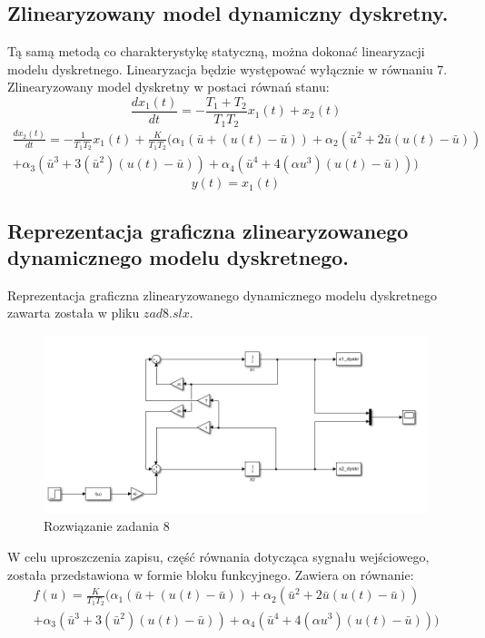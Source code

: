 \subsection{Zlinearyzowany model dynamiczny dyskretny.}
Tą samą metodą co charakterystykę statyczną, można dokonać linearyzacji modelu dyskretnego. Linearyzacja będzie występować wyłącznie w równaniu 7. \\
Zlinearyzowany model dyskretny w postaci równań stanu:
\begin{equation}
\frac{dx_{1}(t)}{dt} = -\frac{T_{1}+T_{2}}{T_{1}T_{2}}x_{1}(t) + x_{2}(t)
\end{equation}
\begin{multline}
\frac{dx_{2}(t)}{dt} = -\frac{1}{T_{1}T_{2}}x_{1}(t) + \frac{K}{T_{1}T_{2}}(\alpha_{1}(\bar{u}+(u(t)-\bar{u})) + \alpha_{2}(\bar{u}^2 + 2\bar{u}(u(t)-\bar{u})) \\
+\alpha_{3}(\bar{u}^3 + 3(\bar{u}^2)(u(t)-\bar{u}))+\alpha_{4}  (\bar{u}^4 + 4(\alpha{u}^3)(u(t)-\bar{u})))
\end{multline}
\begin{equation}
y(t)=x_{1}(t)
\end{equation}
\subsection{Reprezentacja graficzna zlinearyzowanego dynamicznego modelu dyskretnego.}
Reprezentacja graficzna zlinearyzowanego dynamicznego modelu dyskretnego zawarta została w pliku $zad8.slx$.
\begin{figure}[H]
\centering
\includegraphics[width=15cm]{images/zad8.png}
\caption{Rozwiązanie zadania 8}
\label{fig:zad8}
\end{figure}
W celu uproszczenia zapisu, część równania dotycząca sygnału wejściowego, została przedstawiona w formie bloku funkcyjnego. Zawiera on równanie:
\begin{multline}
f(u) = \frac{K}{T_{1}T_{2}}(\alpha_{1}(\bar{u}+(u(t)-\bar{u})) + \alpha_{2}(\bar{u}^2 + 2\bar{u}(u(t)-\bar{u})) \\
+\alpha_{3}(\bar{u}^3 + 3(\bar{u}^2)(u(t)-\bar{u}))+\alpha_{4}  (\bar{u}^4 + 4(\alpha{u}^3)(u(t)-\bar{u})))
\end{multline}

